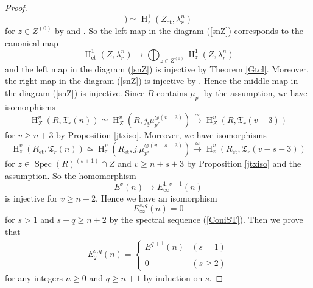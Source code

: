 \documentclass{article}
\newcommand{\spec}{\operatorname{Spec}}
\newcommand{\et}{\mathrm{\acute{e}t}}
\newcommand{\HO}{\operatorname{H}}
\begin{document}
\begin{proof}
\begin{equation*}
) 
\simeq 
\HO^{1}_{z}(
Z_{\et},
\lambda_{r}^{n}
)
\end{equation*}
%
for $z\in Z^{(0)}$
by \cite[Theorem 3.5]{Sak5} and \cite[Lemma 3.7]{Sak5}.
So the left map in the diagram (\ref{snZ})
corresponds to
the canonical map
%
\begin{equation*}
\HO^{1}_{\et}(Z, \lambda^{n}_{r})
\to
\displaystyle\bigoplus_{z\in Z^{(0)}}
\HO^{1}_{z}(Z, \lambda^{n}_{r})
\end{equation*}
%
and the left map in the diagram (\ref{snZ}) is injective 
by Theorem \ref{Gtcl}.
Moreover, the right map in the diagram (\ref{snZ}) is injective 
by \cite[Theorem 3.10]{Sak4}.
Hence the middle map in the diagram (\ref{snZ}) is injective.
Since $B$ contains $\mu_{p^{r}}$ by the assumption,
we have isomorphisms
%
\begin{equation}\label{Ztmiso}
\HO_{Z}^{v}(R, \mathfrak{T}_{r}(n))
\simeq
\HO_{Z}^{v}(R, j_{!}\mu_{p^{r}}^{\otimes (v-3)}
)
\xrightarrow{\simeq}
\HO_{Z}^{v}(R, \mathfrak{T}_{r}(v-3))
\end{equation}
%
for $v\geq n+3$ by Proposition \ref{jtxiso}. 
Moreover, we have isomorphisms
%
\begin{equation}\label{xtmiso}
\HO_{z}^{v}(R_{\et}, \mathfrak{T}_{r}(n)) 
\simeq
\HO_{z}^{v}(R_{\et}, j_{!}\mu_{p^{r}}^{\otimes(v-s-3)}
)
\xrightarrow{\simeq}
\HO_{z}^{v}(R_{\et}, \mathfrak{T}_{r}(v-s-3))
\end{equation}
%
for 
$z\in\spec(R)^{(s+1)}\cap Z$ and $v\geq n+s+3$
by Proposition \ref{jtxiso} and the assumption.
So the homomorphism
%
\begin{equation}\label{EtInf}
E^{v}(n)
\to
E_{\infty}^{1, v-1}(n)
\end{equation}
%
is injective for $v\geq n+2$. Hence
we have an isomorphism
%
\begin{equation}\label{2inf0}
E^{s, q}_{\infty}(n)=0    
\end{equation}
%
for $s>1$ and $s+q\geq n+2$ by the spectral sequence (\ref{ConiST}). 
Then we prove that
%
\begin{align}\label{E2n}
E^{s, q}_{2}(n)
=
%
\begin{cases}
E^{q+1}(n)
& (s=1) \\
\\
0
& (s\geq 2)
\end{cases}
%    
\end{align}
%
for any integers $n\geq 0$ and $q\geq n+1$ by induction on $s$.


\end{proof}
\end{document}
